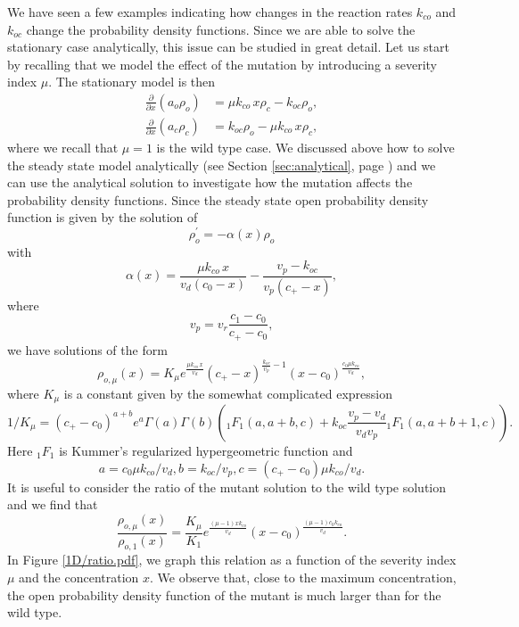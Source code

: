 We have seen a few examples indicating how changes in the reaction rates
$k_{co}$ and $k_{oc}$ change the probability density functions. Since we are
able to solve the stationary case analytically, this issue can be studied in
great detail. Let us start by recalling that we model the effect of the
mutation by introducing a severity index $\mu$. The stationary model is then
\begin{align}
\frac{\partial}{\partial x}\left(  a_{o}\rho_{o}\right)   &  =\mu k_{co}\, x%
\rho_{c}-k_{oc}\rho_{o},\label{steadystate11}\\
\frac{\partial}{\partial x}\left(  a_{c}\rho_{c}\right)   &  =k_{oc}\rho
_{o}-\mu k_{co}\, x \rho_{c}, \label{steadystate12}%
\end{align}
where we recall that $\mu=1$ is the wild type case. We discussed above how to
solve the steady state model analytically
(see Section \ref{sec:analytical}, page \pageref{sec:analytical}) 
and we can use the analytical
solution to investigate how the mutation affects the probability density
functions. 
Since the steady state open probability density function is given
by the solution of
\[
\rho_{o}^{\prime}=-\alpha(x)\rho_{o}%
\]
with%
\[
\alpha(x)=\frac{\mu k_{co}\, x}{v_{d}(c_{0}-x)}-\frac{v_{p}-k_{oc}}{v_{p}(c_{+}-x)},%
\]
where%
\[
v_{p}=v_{r}\frac{c_{1}-c_{0}}{c_{+}-c_{0}},%
\]
we have solutions of the form%
\begin{equation}
\rho_{o,\mu}(x)=K_{\mu}e^{\frac{\mu k_{co}\,x}{v_{d}}}(c_{+}-x)^{\frac{k_{oc}%
}{v_{p}}-1}(x-c_{0})^{\frac{c_{0}\mu k_{co}}{v_{d}}}, \label{rho_o}%
\end{equation}
where $K_{\mu}$ is a constant given by the somewhat complicated
expression\thinspace%
\[
1/K_{\mu}=(c_{+}-c_{0})^{a+b}e^{a}\Gamma(a)\Gamma(b)({}_{1}\!F_{1}%
(a,a+b,c)+k_{oc}\frac{v_{p}-v_{d}}{v_{d}v_{p}}{}_{1}\!F_{1}(a,a+b+1,c)).
\]
Here ${}_{1}\!F_{1}$ is Kummer's regularized hypergeometric function and
\[
a=c_{0}\mu k_{co}/v_{d},b=k_{oc}/v_{p},c=(c_{+}-c_{0})\mu k_{co}/v_{d}.
\] 
It is useful to consider the ratio of the mutant solution to the wild type
solution and we find that%
\[
\frac{\rho_{o,\mu}(x)}{\rho_{o,1}(x)}=\frac{K_{\mu}}{K_{1}}e^{\frac{\left(
\mu-1\right)  xk_{co}}{v_{d}}}(x-c_{0})^{\frac{\left(  \mu-1\right)
c_{0}k_{co}}{v_{d}}}.
\]
In Figure \ref{1D/ratio.pdf}, we graph this relation as a function of the
severity index $\mu$ and the concentration $x.$ We observe that, close to the
maximum concentration, the open probability density function of the mutant 
is much larger than for the wild type.


